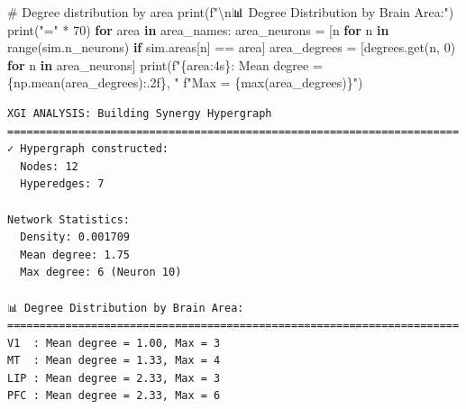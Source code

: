 \documentclass[
  11pt,
  letterpaper,
  oneside,
  openany]{book}
\newenvironment{Shaded}{\begin{snugshade}}{\end{snugshade}}
\newcommand{\BuiltInTok}[1]{\textcolor[rgb]{0.00,0.23,0.31}{#1}}
\newcommand{\CharTok}[1]{\textcolor[rgb]{0.13,0.47,0.30}{#1}}
\newcommand{\CommentTok}[1]{\textcolor[rgb]{0.37,0.37,0.37}{#1}}
\newcommand{\ControlFlowTok}[1]{\textcolor[rgb]{0.00,0.23,0.31}{\textbf{#1}}}
\newcommand{\DecValTok}[1]{\textcolor[rgb]{0.68,0.00,0.00}{#1}}
\newcommand{\KeywordTok}[1]{\textcolor[rgb]{0.00,0.23,0.31}{\textbf{#1}}}
\newcommand{\NormalTok}[1]{\textcolor[rgb]{0.00,0.23,0.31}{#1}}
\newcommand{\OperatorTok}[1]{\textcolor[rgb]{0.37,0.37,0.37}{#1}}
\newcommand{\SpecialCharTok}[1]{\textcolor[rgb]{0.37,0.37,0.37}{#1}}
\newcommand{\SpecialStringTok}[1]{\textcolor[rgb]{0.13,0.47,0.30}{#1}}
\newcommand{\StringTok}[1]{\textcolor[rgb]{0.13,0.47,0.30}{#1}}
\begin{document}
\begin{Shaded}
\begin{Highlighting}[]
\CommentTok{\# Degree distribution by area}
\BuiltInTok{print}\NormalTok{(}\SpecialStringTok{f"}\CharTok{\textbackslash{}n}\SpecialStringTok{📊 Degree Distribution by Brain Area:"}\NormalTok{)}
\BuiltInTok{print}\NormalTok{(}\StringTok{"="} \OperatorTok{*} \DecValTok{70}\NormalTok{)}
\ControlFlowTok{for}\NormalTok{ area }\KeywordTok{in}\NormalTok{ area\_names:}
\NormalTok{    area\_neurons }\OperatorTok{=}\NormalTok{ [n }\ControlFlowTok{for}\NormalTok{ n }\KeywordTok{in} \BuiltInTok{range}\NormalTok{(sim.n\_neurons) }\ControlFlowTok{if}\NormalTok{ sim.areas[n] }\OperatorTok{==}\NormalTok{ area]}
\NormalTok{    area\_degrees }\OperatorTok{=}\NormalTok{ [degrees.get(n, }\DecValTok{0}\NormalTok{) }\ControlFlowTok{for}\NormalTok{ n }\KeywordTok{in}\NormalTok{ area\_neurons]}
    \BuiltInTok{print}\NormalTok{(}\SpecialStringTok{f"}\SpecialCharTok{\{}\NormalTok{area}\SpecialCharTok{:4s\}}\SpecialStringTok{: Mean degree = }\SpecialCharTok{\{}\NormalTok{np}\SpecialCharTok{.}\NormalTok{mean(area\_degrees)}\SpecialCharTok{:.2f\}}\SpecialStringTok{, "}
          \SpecialStringTok{f"Max = }\SpecialCharTok{\{}\BuiltInTok{max}\NormalTok{(area\_degrees)}\SpecialCharTok{\}}\SpecialStringTok{"}\NormalTok{)}
\end{Highlighting}
\end{Shaded}

\begin{verbatim}
XGI ANALYSIS: Building Synergy Hypergraph
======================================================================
✓ Hypergraph constructed:
  Nodes: 12
  Hyperedges: 7

Network Statistics:
  Density: 0.001709
  Mean degree: 1.75
  Max degree: 6 (Neuron 10)

📊 Degree Distribution by Brain Area:
======================================================================
V1  : Mean degree = 1.00, Max = 3
MT  : Mean degree = 1.33, Max = 4
LIP : Mean degree = 2.33, Max = 3
PFC : Mean degree = 2.33, Max = 6
\end{verbatim}
\end{document}
